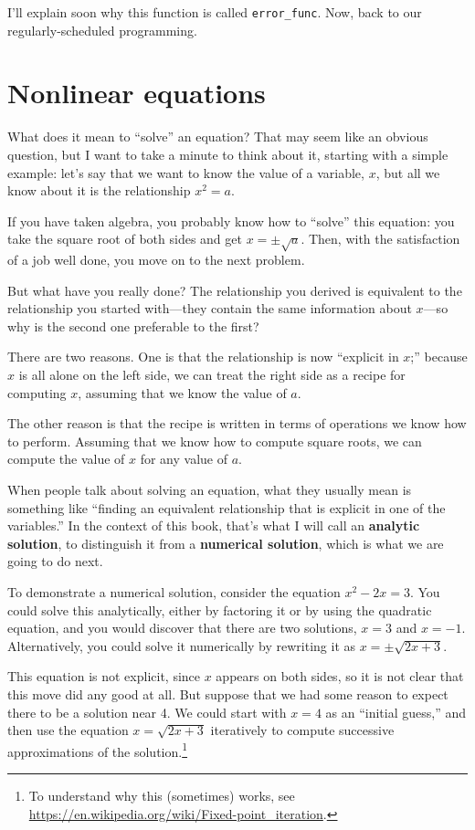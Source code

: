 \documentclass{book}
\begin{document}
I'll explain soon why this function is called {\tt error\_func}.
Now, back to our regularly-scheduled programming.



\section{Nonlinear equations}

What does it mean to ``solve'' an equation?  That may seem like an
obvious question, but I want to take a minute to think about it,
starting with a simple example: let's say that we want to know the
value of a variable, $x$, but all we know about it is the relationship
$x^2 = a$.

If you have taken algebra, you probably know how to ``solve'' this
equation: you take the square root of both sides and get
$x = \pm \sqrt{a}$.  Then, with the satisfaction of a job well done,
you move on to the next problem.

But what have you really done?  The relationship you derived is
equivalent to the relationship you started with---they contain the
same information about $x$---so why is the second one preferable
to the first?

There are two reasons.  One is that the relationship is now ``explicit
in $x$;'' because $x$ is all alone on the left side, we can treat
the right side as a recipe for computing $x$, assuming that we
know the value of $a$.

The other reason is that the recipe is written in terms of operations
we know how to perform.  Assuming that we know how to compute square
roots, we can compute the value of $x$ for any value of $a$.

When people talk about solving an equation, what they usually mean
is something like ``finding an equivalent relationship that is
explicit in one of the variables.''  In the context of this book,
that's what I will call an {\bf analytic solution}, to distinguish
it from a {\bf numerical solution}, which is what we are going to
do next.

To demonstrate a numerical solution, consider the equation $x^2 - 2x =
3$.  You could solve this analytically, either by factoring it or by
using the quadratic equation, and you would discover that there are
two solutions, $x=3$ and $x=-1$.  Alternatively, you could solve it
numerically by rewriting it as $x =\pm \sqrt{2x+3}$.

This equation is not explicit, since $x$ appears on both sides, so
it is not clear that this move did any good at all.  But suppose
that we had some reason to expect there to be a solution near 4.
We could start with $x=4$ as an ``initial guess,'' and then use
the equation $x = \sqrt{2x+3}$ iteratively to compute successive
approximations of the solution.\footnote{To understand why this
(sometimes) works, see
\url{https://en.wikipedia.org/wiki/Fixed-point_iteration}.}
\end{document}
